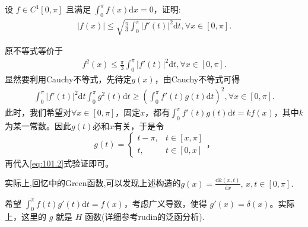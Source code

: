\documentclass[../../main.tex]{subfiles}
\begin{document}
\begin{example}设 \(f \in C^1[0, \pi]\) 且满足 \(\int_{0}^{\pi} f(x) \mathrm{d}x = 0\)，证明:
\begin{align*}
|f(x)|\leqslant \sqrt{\frac{\pi}{3}\int_0^{\pi}{|f\prime (t)|^2\mathrm{d}t}},\forall x\in [0,\pi ].
\end{align*} 
\end{example}
\begin{remark}
原不等式等价于
\begin{align*}
f^2(x) \leqslant \frac{\pi}{3}\int_0^{\pi} |f'(t)|^2\mathrm{d}t, \forall x\in [0, \pi].
\end{align*}
显然要利用Cauchy不等式，先待定\(g(x)\)，由Cauchy不等式可得
\begin{align}
\int_0^{\pi} |f'(t)|^2\mathrm{d}t\int_0^{\pi} g^2(t) \mathrm{d}t\geqslant \left( \int_0^{\pi} f'(t)g(t) \mathrm{d}t \right) ^2, \forall x\in [0, \pi]. \label{eq:101.2}
\end{align}
此时，我们希望对\(\forall x\in [0, \pi]\)，固定\(x\)，都有\(\int_0^{\pi} f'(t)g(t) \mathrm{d}t = kf(x)\)，其中\(k\)为某一常数。因此\(g(t)\)必和\(x\)有关，于是令
\[g(t) = 
\begin{cases}
t - \pi, & t\in [x, \pi]\\
t, & t\in [0, x]
\end{cases}，
\]
再代入\eqref{eq:101.2}式验证即可。

实际上,回忆中的Green函数,可以发现上述构造的$g(x)=\frac{\mathrm{d}k\left( x,t \right)}{\mathrm{d}x},\,x,t\in [0,\pi].$

希望 \(\int_0^{\pi} f(t)g'(t) \mathrm{d}t = f(x)\)，考虑广义导数，使得 \(g'(x) = \delta(x)\)。实际上，这里的 \(g\) 就是 \(H\) 函数(详细参考rudin的泛函分析).
\end{remark}
\end{document}
